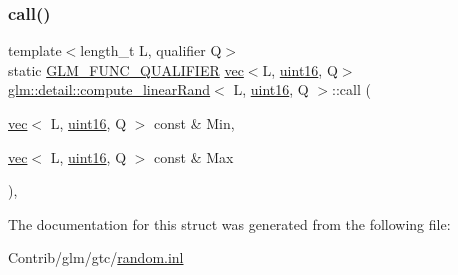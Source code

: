\subsubsection{\texorpdfstring{call()}{call()}}
{\footnotesize\ttfamily template$<$length\+\_\+t L, qualifier Q$>$ \\
static \mbox{\hyperlink{setup_8hpp_a33fdea6f91c5f834105f7415e2a64407}{G\+L\+M\+\_\+\+F\+U\+N\+C\+\_\+\+Q\+U\+A\+L\+I\+F\+I\+ER}} \mbox{\hyperlink{structglm_1_1vec}{vec}}$<$L, \mbox{\hyperlink{namespaceglm_1_1detail_a47b2a7d006d187338e8031a352d1ce56}{uint16}}, Q$>$ \mbox{\hyperlink{structglm_1_1detail_1_1compute__linear_rand}{glm\+::detail\+::compute\+\_\+linear\+Rand}}$<$ L, \mbox{\hyperlink{namespaceglm_1_1detail_a47b2a7d006d187338e8031a352d1ce56}{uint16}}, Q $>$\+::call (\begin{DoxyParamCaption}\item[{\mbox{\hyperlink{structglm_1_1vec}{vec}}$<$ L, \mbox{\hyperlink{namespaceglm_1_1detail_a47b2a7d006d187338e8031a352d1ce56}{uint16}}, Q $>$ const \&}]{Min,  }\item[{\mbox{\hyperlink{structglm_1_1vec}{vec}}$<$ L, \mbox{\hyperlink{namespaceglm_1_1detail_a47b2a7d006d187338e8031a352d1ce56}{uint16}}, Q $>$ const \&}]{Max }\end{DoxyParamCaption})\hspace{0.3cm}{\ttfamily [inline]}, {\ttfamily [static]}}



The documentation for this struct was generated from the following file\+:\begin{DoxyCompactItemize}
\item 
Contrib/glm/gtc/\mbox{\hyperlink{random_8inl}{random.\+inl}}\end{DoxyCompactItemize}
